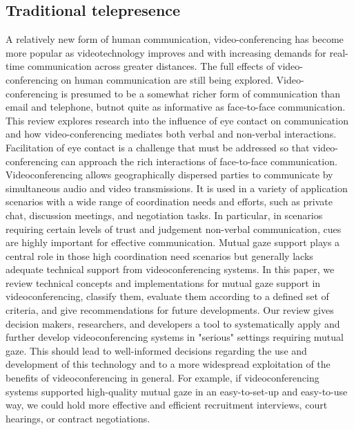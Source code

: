 \subsection{Traditional telepresence}

A relatively new form of human communication, video-conferencing has become more popular as videotechnology improves and with increasing demands for real-time communication across greater distances. The full effects of video-conferencing on human communication are still being explored. Video-conferencing is presumed to be a somewhat richer form of communication than email and telephone, butnot quite as informative as face-to-face communication. This review explores research into the influence of eye contact on communication and how video-conferencing mediates both verbal and non-verbal interactions. Facilitation of eye contact is a challenge that must be addressed so that video-conferencing can approach the rich interactions of face-to-face communication.\\

Videoconferencing allows geographically dispersed parties to communicate by simultaneous audio and video transmissions. It is used in a variety of application scenarios with a wide range of coordination needs and efforts, such as private chat, discussion meetings, and negotiation tasks. In particular, in scenarios requiring certain levels of trust and judgement non-verbal communication, cues are highly important for effective communication. Mutual gaze support plays a central role in those high coordination need scenarios but generally lacks adequate technical support from videoconferencing systems. In this paper, we review technical concepts and implementations for mutual gaze support in videoconferencing, classify them, evaluate them according to a defined set of criteria, and give recommendations for future developments. Our review gives decision makers, researchers, and developers a tool to systematically apply and further develop videoconferencing systems in "serious" settings requiring mutual gaze. This should lead to well-informed decisions regarding the use and development of this technology and to a more widespread exploitation of the benefits of videoconferencing in general. For example, if videoconferencing systems supported high-quality mutual gaze in an easy-to-set-up and easy-to-use way, we could hold more effective and efficient recruitment interviews, court hearings, or contract negotiations.

